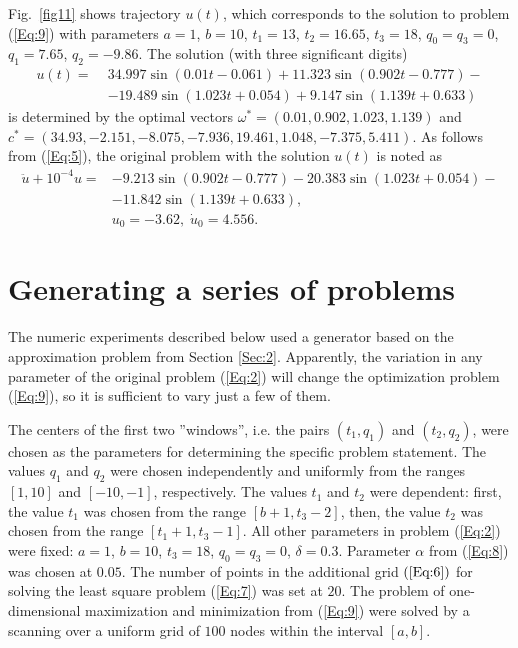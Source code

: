 \documentclass{llncs}
\begin{document}
Fig.~\ref{fig11} shows trajectory $u(t)$, which corresponds to the solution to problem (\ref{Eq:9}) with parameters $a=1$, $b=10$, $t_1=13$, $t_2=16.65$, $t_3=18$, $q_0=q_3=0$, $q_1=7.65$, $q_2=-9.86$. The solution (with three significant digits)
\begin{eqnarray} \nonumber 
u(t)= \; &34.997\sin(0.01t-0.061)+11.323\sin(0.902t-0.777)- \nonumber \\
      &-19.489\sin(1.023t+0.054)+9.147 \sin(1.139t+0.633) \nonumber
\end{eqnarray}
is determined by the optimal vectors $\omega^\ast =(0.01, 0.902 , 1.023, 1.139)$ and $c^\ast=( 34.93, -2.151, -8.075, -7.936, 19.461, 1.048, -7.375, 5.411)$. As follows from (\ref{Eq:5}), the original problem with the solution $u(t)$ is noted as 
\begin{eqnarray} \nonumber 
\ddot{u}+10^{-4}u = & -9.213\sin(0.902t-0.777)-20.383\sin(1.023t+0.054)- \nonumber \\
                    &-11.842 \sin(1.139t+0.633), \nonumber \\
                    &u_0= -3.62, \; \dot{u}_0 = 4.556.\nonumber
\end{eqnarray}


\section{Generating a series of problems}\label{Sec:3}

The numeric experiments described below used a generator based on the approximation problem from Section \ref{Sec:2}. Apparently, the variation in any parameter of the original problem (\ref{Eq:2}) will change the optimization problem (\ref{Eq:9}), so it is sufficient to vary just a few of them.

The centers of the first two ''windows'', i.e. the pairs  $(t_1, q_1)$ and $(t_2, q_2)$, were chosen as the parameters for determining the specific problem statement. The values $q_1$ and $q_2$ were chosen independently and uniformly from the ranges  $[1,10]$ and $[-10, -1]$, respectively. The values $t_1$ and $t_2$ were dependent: first, the value $t_1$ was chosen from the range $[b+1, t_3-2]$, then, the value $t_2$ was chosen from the range $[t_1+1, t_3-1]$. All other parameters in problem (\ref{Eq:2}) were fixed: $a=1$, $b=10$, $t_3=18$, $q_0=q_3=0$, $\delta=0.3$. Parameter $\alpha$ from (\ref{Eq:8}) was chosen at $0.05$. The number of points in the additional grid $(\ref{Eq:6})$ for solving the least square problem (\ref{Eq:7}) was set at $20$. The problem of one-dimensional maximization and minimization from (\ref{Eq:9}) were solved by a scanning over a uniform grid of $100$ nodes within the interval $[a,b]$.
\end{document}
